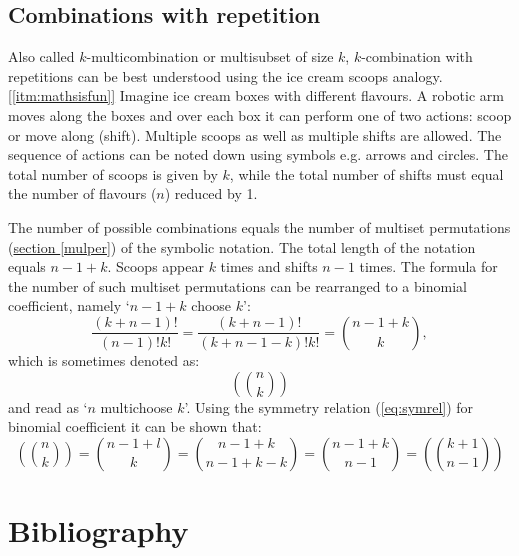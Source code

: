 \documentclass{article}
\begin{document}
\subsection{Combinations with repetition}

Also called $k$\nobreakdash-\hspace{0pt}multicombination or multisubset of size $k$, $k$\nobreakdash-\hspace{0pt}combination with repetitions can be best understood using the ice cream scoops analogy.\hyperref[itm:mathsisfun]{[\ref*{itm:mathsisfun}]}
Imagine ice cream boxes with different flavours.
A robotic arm moves along the boxes and over each box it can perform one of two actions: scoop or move along (shift).
Multiple scoops as well as multiple shifts are allowed.
The sequence of actions can be noted down using symbols e.g. arrows and circles.
The total number of scoops is given by $k$, while the total number of shifts must equal the number of flavours ($n$) reduced by 1.

The number of possible combinations equals the number of multiset permutations (\hyperref[mulper]{section \ref*{mulper}}) of the symbolic notation.
The total length of the notation equals $n-1+k$.
Scoops appear $k$ times and shifts $n-1$ times.
The formula for the number of such multiset permutations can be rearranged to a binomial coefficient, namely `$n-1+k$ choose $k$':
\begin{equation}
  \frac{(k+n-1)!}{(n-1)!k!} = \frac{(k+n-1)!}{(k+n-1-k)!k!} = \binom{n-1+k}{k},
\end{equation}
which is sometimes denoted as:
\begin{equation*}
  \left(\!\!\!\binom{n}{k}\!\!\!\right)
\end{equation*}
and read as `$n$ multichoose $k$'. Using the symmetry relation (\hyperref[eq:symrel]{\ref*{eq:symrel}}) for binomial coefficient it can be shown that:
\begin{equation}
  \left(\!\!\!\binom{n}{k}\!\!\!\right) = \binom{n-1+l}{k} = \binom{n-1+k}{n-1+k-k} = \binom{n-1+k}{n-1} = \left(\!\!\!\binom{k+1}{n-1}\!\!\!\right)
\end{equation}

\section*{Bibliography}
\end{document}
